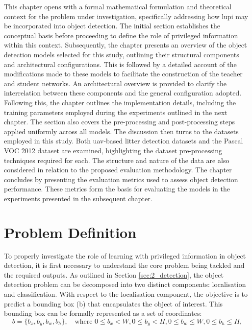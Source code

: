 This chapter opens with a formal mathematical formulation and theoretical context for the problem under investigation, specifically addressing how \gls{lupi} may be incorporated into object detection. The initial section establishes the conceptual basis before proceeding to define the role of privileged information within this context.
Subsequently, the chapter presents an overview of the object detection models selected for this study, outlining their structural components and architectural configurations. This is followed by a detailed account of the modifications made to these models to facilitate the construction of the teacher and student networks. An architectural overview is provided to clarify the interrelation between these components and the general configuration adopted.
Following this, the chapter outlines the implementation details, including the training parameters employed during the experiments outlined in the next chapter. The section also covers the pre-processing and post-processing steps applied uniformly across all models.
The discussion then turns to the datasets employed in this study. Both \gls{uav}-based litter detection datasets and the Pascal VOC 2012 dataset are examined, highlighting the dataset pre-processing techniques required for each. The structure and nature of the data are also considered in relation to the proposed evaluation methodology.
The chapter concludes by presenting the evaluation metrics used to assess object detection performance. These metrics form the basis for evaluating the models in the experiments presented in the subsequent chapter.

\section{Problem Definition}
\label{sec:4_problem_definition}

To properly investigate the role of learning with privileged information in object detection, it is first necessary to understand the core problem being tackled and the required outputs. As outlined in Section \ref{sec:2_detection}, the object detection problem can be decomposed into two distinct components: localisation and classification.
With respect to the localisation component, the objective is to predict a bounding box (\gls{b}) that encapsulates the object of interest. This bounding box can be formally represented as a set of coordinates:
\begin{equation}
\label{eq:bounding_box}
b = \{b_x, b_y, b_w, b_h\}, \quad \text{where } 0 \leq b_x < W, 0 \leq b_y < H, 0 \leq b_w \leq W, 0 \leq b_h \leq H,
\end{equation}

